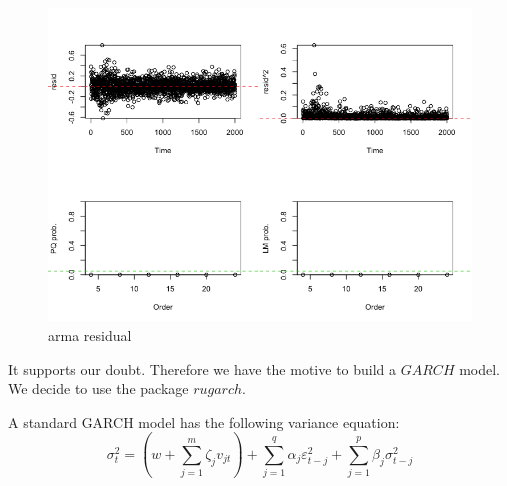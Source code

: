 \documentclass[a4paper, 11pt]{article}
\begin{document}
\begin{figure}[H]
\centering
\caption{arma residual}
\includegraphics[scale=.50]{hetero.png}
\end{figure}



\indent It supports our doubt. Therefore we have the motive to build a $GARCH$ model. We decide to use the package $rugarch$.\par
A standard GARCH model has the following variance equation:
\begin{equation*}
	\sigma_t^2 = (w + \sum_{j = 1}^m \zeta_j v_{jt}) + \sum_{j = 1}^q \alpha_j \varepsilon_{t-j}^2 + \sum_{j = 1}^p \beta_j \sigma_{t-j}^2
\end{equation*} 
\end{document}
